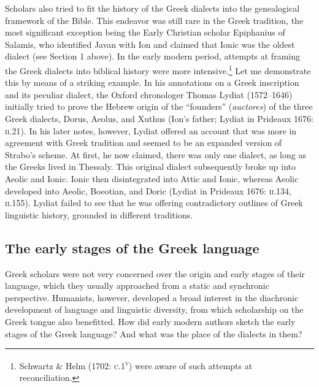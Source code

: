 \begin{styleStandard}
Scholars also tried to fit the history of the Greek dialects into the genealogical framework of the Bible. This endeavor was still rare in the Greek tradition, the most significant exception being the Early Christian scholar Epiphanius of Salamis, who identified Javan with Ion and claimed that Ionic was the oldest dialect (see Section 1 above). In the early modern period, attempts at framing the Greek dialects into biblical history were more intensive.\footnote{ Schwartz \& Helm (1702: \textsc{c.1}\textsc{\textsuperscript{v}}) were aware of such attempts at reconciliation.} Let me demonstrate this by means of a striking example. In his annotations on a Greek inscription and its peculiar dialect, the Oxford chronologer Thomas Lydiat (1572–1646) initially tried to prove the Hebrew origin of the “founders” (\textit{auctores})\textit{ }of the three Greek dialects, Dorus, Aeolus, and Xuthus (Ion’s father; Lydiat in Prideaux 1676: \textsc{ii}.21). In his later notes, however, Lydiat offered an account that was more in agreement with Greek tradition and seemed to be an expanded version of Strabo’s scheme. At first, he now claimed, there was only one dialect, as long as the Greeks lived in Thessaly. This original dialect subsequently broke up into Aeolic and Ionic. Ionic then disintegrated into Attic and Ionic, whereas Aeolic developed into Aeolic, Boeotian, and Doric (Lydiat in Prideaux 1676: \textsc{ii.134}, \textsc{ii.}155). Lydiat failed to see that he was offering contradictory outlines of Greek linguistic history, grounded in different traditions.
\end{styleStandard}

\subsection{The early stages of the Greek language}
\hypertarget{Toc19704838}{}\begin{styleStandard}
Greek scholars were not very concerned over the origin and early stages of their language, which they usually approached from a static and synchronic perspective. Humanists, however, developed a broad interest in the diachronic development of language and linguistic diversity, from which scholarship on the Greek tongue also benefitted. How did early modern authors sketch the early stages of the Greek language? And what was the place of the dialects in them?
\end{styleStandard}

